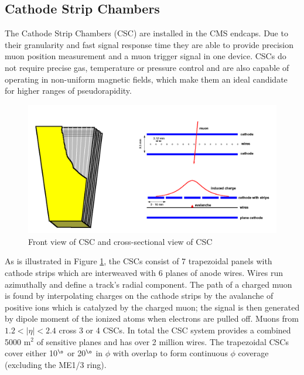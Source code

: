 \subsection{Cathode Strip Chambers}
The Cathode Strip Chambers (CSC) are installed in the CMS endcaps.
Due to their granularity and fast signal response time they are able to provide precision muon 
position measurement and a muon trigger signal in one device. CSCs do not 
require precise gas, temperature or pressure control and are also capable of operating
in non-uniform magnetic fields, which make them an ideal candidate for higher
ranges of pseudorapidity. 
\begin{figure}[hb]
  \centering
	\includegraphics[width=1\textwidth]{images/CSC2images.png}
  	\caption[Cathode Strip Chambers]
   	{Front view of CSC and cross-sectional view of CSC}
	\label{fig:cscImage}
\end{figure}
As is illustrated in Figure \ref{fig:cscImage},
the CSCs consist of 7 trapezoidal panels with cathode strips which are interweaved with
6 planes of anode wires. Wires run azimuthally and define a track's 
radial component. The path of a charged muon is found by interpolating charges
on the cathode strips by the avalanche of positive ions which is catalyzed by
the charged muon; the signal is then generated by dipole moment of the ionized atoms
when electrons are pulled off. %
Muons from $1.2<|\eta|<2.4$ cross 3 or 4 CSCs. In total the CSC system provides
a combined 5000 m$^2$ of sensitive planes and has over 2 million wires.
The trapezoidal CSCs cover either 10$^{\o}$ or 20$^{\o}$ in $\phi$
 with overlap to form continuous $\phi$ coverage (excluding the ME1/3 ring).


